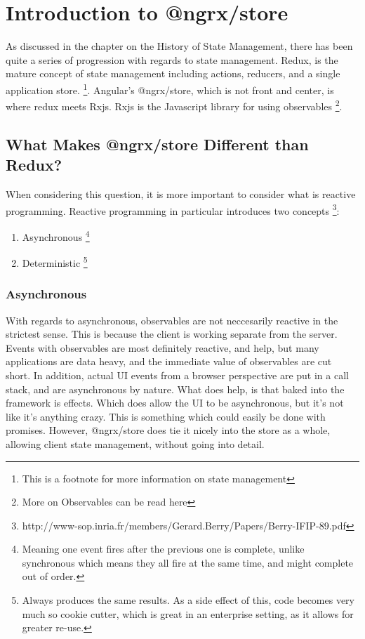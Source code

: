 \maketitle{}
\section{ Introduction to @ngrx/store }

As discussed in the chapter on the History of State Management, there has
been quite a series of progression with regards to state management. Redux, is
the mature concept of state management including actions, reducers, and a single
application store. \footnote{This is a footnote for more information on state management}.
Angular's @ngrx/store, which is not front and center, is where redux meets Rxjs.
Rxjs is the Javascript library for using observables
\footnote{More on Observables can be read here}.

\subsection{What Makes @ngrx/store Different than Redux?}
When considering this question, it is more important to consider what is
reactive programming. Reactive programming in particular introduces two concepts
\footnote{http://www-sop.inria.fr/members/Gerard.Berry/Papers/Berry-IFIP-89.pdf}:

\begin{enumerate}
  \item Asynchronous \footnote{Meaning one event fires after the previous one is
  complete, unlike synchronous which means they all fire at the same time, and
  might complete out of order.}
  \item Deterministic \footnote{Always produces the same results. As a side
  effect of this, code becomes very much so cookie cutter, which is great in
  an enterprise setting, as it allows for greater re-use.}
\end{enumerate}

\subsubsection{Asynchronous}
With regards to asynchronous, observables are not neccesarily reactive in the
strictest sense. This is because the client is working separate from the server.
Events with observables are most definitely reactive, and help, but many
applications are data heavy, and the immediate value of observables are cut
short. In addition, actual UI events from a browser perspective are put in a
call stack, and are asynchronous by nature. What does help, is that baked into
the framework is effects. Which does allow the UI to be asynchronous, but it's
not like it's anything crazy. This is something which could easily be done with
promises. However, @ngrx/store does tie it nicely into the store as a whole,
allowing client state management, without going into detail.

